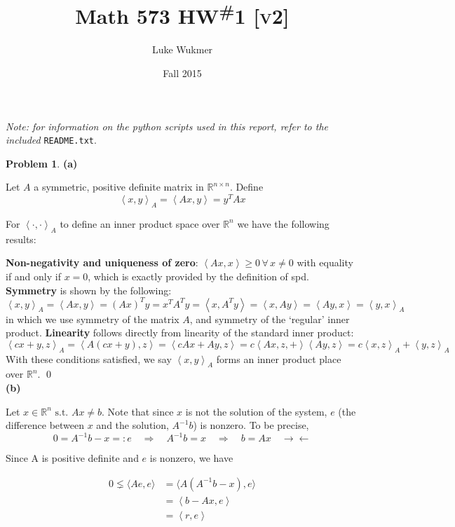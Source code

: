 \documentclass[10pt]{article}
\theoremstyle{plain}
\theoremstyle{definition}
\newtheorem{prob}{Problem}
\providecommand{\R}{\mathbb{R}}%
\numberwithin{equation}{section}
\newcommand\ip[2]{ \left\langle {#1} , {#2} \right\rangle }
\providecommand{\st}{\text{ s.t. }}
\begin{document}
\title{Math 573 HW\textsuperscript{\#}1 \textsc{[v2]}}
\author{Luke Wukmer}
\date{Fall 2015}
\maketitle \thispagestyle{empty} %

%
\begin{small} \textit{Note: for information on the python scripts used in this
report, refer to the included} \texttt{README.txt}.\end{small}

\begin{prob}
\textbf{(a)}

Let $A$ a symmetric, positive definite matrix in $\R^{ n\times n}$. Define
\[
        \ip{x}{y}_A = \ip{Ax}{y} = y^TAx
    \]

    For $\ip{\cdot}{\cdot}_A$ to define an inner product space over $\R^n$
    we have the following results:

    \textbf{Non-negativity and uniqueness of zero}:
            $\ip{Ax}{x} \geq 0 \,\forall\, x \neq 0$ with equality
            if and only if $x = 0$,
            which is exactly provided by the definition of
            spd.
    \textbf{Symmetry} is shown by the following:
        \[
                \ip{x}{y}_A = \ip{Ax}{y} = (Ax)^Ty = x^T A^T y = \ip{x}{A^Ty} =
                \ip{x}{Ay} = \ip{Ay}{x} = \ip{y}{x}_A
    \]
    in which we use symmetry of the matrix $A$, and symmetry of the `regular'
    inner product. \textbf{Linearity} follows directly from linearity of the standard
    inner product:
    \[
            \ip{cx+y}{z}_A = \ip{A(cx+y)}{z} = \ip{cAx + Ay}{z}
            = c\ip{Ax,z} + \ip{Ay}{z} = c\ip{x}{z}_A + \ip{y}{z}_A
        \]
        With these conditions satisfied, we say $\ip{x}{y}_A$ forms an
        inner product place over $\R^n$. \qed \\
\textbf{(b)}

Let $x \in \R^n \st Ax \neq b$. Note that since $x$ is not the solution of the
system,  $e$ (the difference between $x$ and the
solution, $A^{-1}b$) is nonzero. To be precise,
\[
    0 = A^{-1}b -x =: e \quad \Longrightarrow \quad A^{-1}b = x \quad \Longrightarrow \quad
        b = Ax \quad\rightarrow\leftarrow
\]

Since A is positive definite and $e$ is nonzero, we have

\begin{align*}
        0 \lneq \langle Ae,e \rangle &=
            \langle A \left(A^{-1}b -x \right) , e \rangle \\
                                    &=  \ip{b - Ax}{e} \\
                                    &= \ip{r}{e}
\end{align*}


\end{prob}
\end{document}
